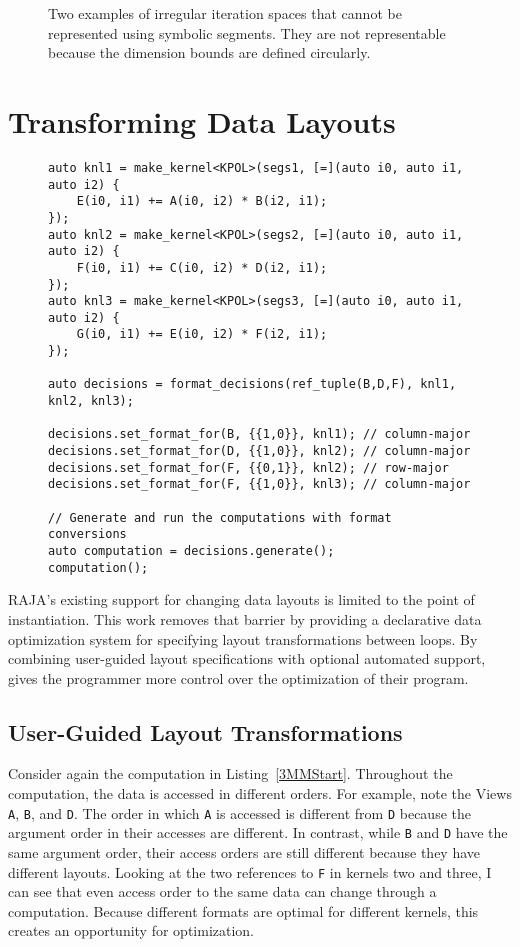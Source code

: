 \begin{figure}
\caption{Two examples of irregular iteration spaces that cannot be represented using symbolic segments. They are not representable because the dimension bounds are defined circularly.}\label{badShapes}
\end{figure}

\section{Transforming Data Layouts}

\begin{figure}
\begin{lstlisting}[caption={Changing data layouts for three Views in the \textsc{3mm} benchmark using \FormatDecisions.},
	label={FormatDecisions3MM}]
auto knl1 = make_kernel<KPOL>(segs1, [=](auto i0, auto i1, auto i2) {
	E(i0, i1) += A(i0, i2) * B(i2, i1);
});
auto knl2 = make_kernel<KPOL>(segs2, [=](auto i0, auto i1, auto i2) {
	F(i0, i1) += C(i0, i2) * D(i2, i1);
});
auto knl3 = make_kernel<KPOL>(segs3, [=](auto i0, auto i1, auto i2) {
	G(i0, i1) += E(i0, i2) * F(i2, i1);
});

auto decisions = format_decisions(ref_tuple(B,D,F), knl1, knl2, knl3);

decisions.set_format_for(B, {{1,0}}, knl1); // column-major
decisions.set_format_for(D, {{1,0}}, knl2); // column-major
decisions.set_format_for(F, {{0,1}}, knl2); // row-major
decisions.set_format_for(F, {{1,0}}, knl3); // column-major

// Generate and run the computations with format conversions
auto computation = decisions.generate();
computation();
\end{lstlisting}
\end{figure}

RAJA's existing support for changing data layouts is limited to the point of instantiation.
This work removes that barrier by providing a declarative data optimization system for specifying layout transformations between loops.
By combining user-guided layout specifications with optional automated support, \FormatDecisions{} gives the programmer more control over the optimization of their program.

\subsection{User-Guided Layout Transformations}

Consider again the computation in Listing~\ref{3MMStart}.
Throughout the computation, the data is accessed in different orders.
For example, note the Views \verb.A., \verb.B., and \verb.D..
The order in which \verb.A. is accessed is different from \verb.D. because the argument order in their accesses are different.
In contrast, while \verb.B. and \verb.D. have the same argument order, their access orders are still different because they have different layouts.
Looking at the two references to \verb.F. in kernels two and three, I can see that even access order to the same data can change through a computation.
Because different formats are optimal for different kernels, this creates an opportunity for optimization. 

